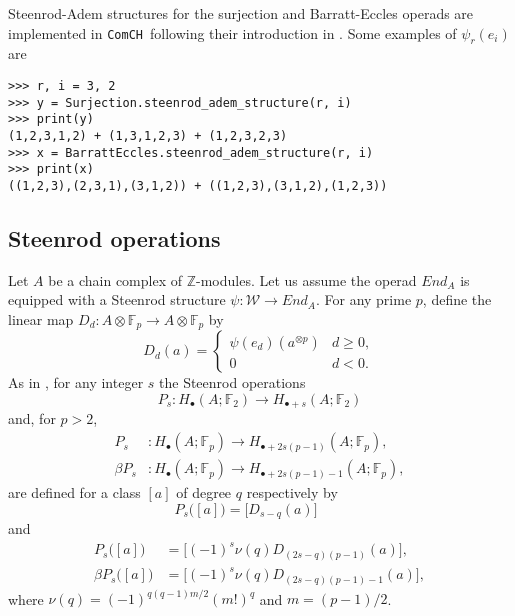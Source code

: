 \documentclass{amsart}
\newcommand{\comch}{\texttt{ComCH}}
\begin{document}
Steenrod-Adem structures for the surjection and Barratt-Eccles operads are implemented in \comch\, following their introduction in \cite{medina2020chain}. Some examples of $\psi_r(e_i)$ are

\begin{Verbatim}[frame=single, samepage=true]
>>> r, i = 3, 2
>>> y = Surjection.steenrod_adem_structure(r, i)
>>> print(y)
(1,2,3,1,2) + (1,3,1,2,3) + (1,2,3,2,3)
>>> x = BarrattEccles.steenrod_adem_structure(r, i)
>>> print(x)
((1,2,3),(2,3,1),(3,1,2)) + ((1,2,3),(3,1,2),(1,2,3))
\end{Verbatim}

\subsection{Steenrod operations}

Let $A$ be a chain complex of $\mathbb Z$-modules. Let us assume the operad $End_A$ is equipped with a Steenrod structure $\psi \colon \mathcal W \to End_A$. For any prime $p$, define the linear map $D_d \colon A \otimes \mathbb F_p \to A \otimes \mathbb F_p$ by
\begin{equation*}
D_d(a) = \begin{cases}
\psi(e_d)(a^{\otimes p}) & d \geq 0, \\
0 & d < 0.
\end{cases}
\end{equation*}
As in \cite{May70algebraic}, for any integer $s$ the Steenrod operations
\begin{equation*}
P_s : H_\bullet(A; \mathbb F_2) \to H_{\bullet + s}(A; \mathbb F_2)
\end{equation*}
and, for $p > 2$,
\begin{align*}
P_s & \colon H_\bullet(A; \mathbb F_p) \to H_{\bullet + 2s(p-1)}(A; \mathbb F_p), \\
\beta P_s & \colon H_\bullet(A; \mathbb F_p) \to H_{\bullet + 2s(p-1) - 1}(A; \mathbb F_p),
\end{align*}
are defined for a class $[a]$ of degree $q$ respectively by
\begin{equation*}
P_s\big([a]\big) = \big[D_{s-q}(a)\big] \qquad
\end{equation*}
and
\begin{align*}
P_s\big([a]\big) & = \big[(-1)^s \nu(q) D_{(2s-q)(p-1)}(a)\big], \\
\beta P_s\big([a]\big) & = \big[(-1)^s \nu(q)D_{(2s-q)(p-1)-1}(a)\big],
\end{align*}
where $\nu(q) = (-1)^{q(q-1)m/2}(m!)^q$ and $m = (p-1)/2$.
\end{document}
